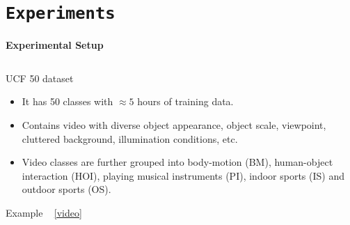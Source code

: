 \section{\texttt{Experiments}}
\begin{frame}{\textbf{Experimental Setup}}
\begin{columns}
	\begin{column}{0.9\textwidth}
		\begin{varblock}[\textwidth]{UCF 50 dataset\footnotemark}
			\begin{itemize}
				\item It has 50 classes with $\approx 5$ hours of training data.
				\item Contains video with diverse object appearance, object scale, viewpoint, cluttered background, illumination conditions, etc.
				\item Video classes are further grouped into body-motion (BM), human-object interaction (HOI), playing musical instruments (PI), indoor sports (IS) and outdoor sports (OS).
			\end{itemize}
		\end{varblock}
		\begin{center}
			Example ~ \href{run:videos/allclasses.avi}{\color{red}[video]}
		\end{center}
	\end{column}	
\end{columns}
\end{frame}
